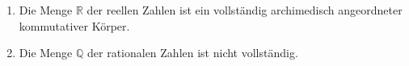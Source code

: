 \begin{enumerate}[label=\alph*)]
    \item Die Menge $\mathbb{R}$ der reellen Zahlen ist ein vollständig archimedisch angeordneter kommutativer Körper.
    \item Die Menge $\mathbb{Q}$ der rationalen Zahlen ist nicht vollständig.
\end{enumerate}